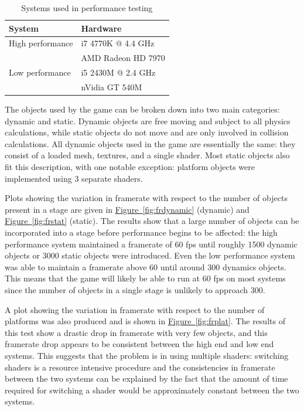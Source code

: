 \documentclass[12pt, titlepage]{article}
\begin{document}
\begin{table}[ht]
\caption{Systems used in performance testing} \label{tab:systems}
\begin{tabularx}{\textwidth}{p{5cm}X}
\toprule {\bf System} & {\bf Hardware}\\
\midrule
High performance & i7 4770K @ 4.4 GHz\\
& AMD Radeon HD 7970\\[10pt]
Low performance & i5 2430M @ 2.4 GHz\\
& nVidia GT 540M\\
\bottomrule
\end{tabularx}
\end{table}

The objects used by the game can be broken down into two main categories:  dynamic and static.  Dynamic objects are free moving and subject to all physics calculations, while static objects do not move and are only involved in collision calculations.  All dynamic objects used in the game are essentially the same: they consist of a loaded mesh, textures, and a single shader.  Most static objects also fit this description, with one notable exception:  platform objects were implemented using 3 separate shaders.

Plots showing the variation in framerate with respect to the number of objects present in a stage are given in \hyperref[fig:frdynamic]{Figure~\ref*{fig:frdynamic}} (dynamic) and \hyperref[fig:frstat]{Figure~\ref*{fig:frstat}} (static).  The results show that a large number of objects can be incorporated into a stage before performance begins to be affected:  the high performance system maintained a framerate of 60 fps until roughly 1500 dynamic objects or 3000 static objects were introduced.  Even the low performance system was able to maintain a framerate above 60 until around 300 dynamics objects.  This means that the game will likely be able to run at 60 fps on most systems since the number of objects in a single stage is unlikely to approach 300.  

A plot showing the variation in framerate with respect to the number of platforms was also produced and is shown in \hyperref[fig:frplat]{Figure~\ref*{fig:frplat}}.  The results of this test show a drastic drop in framerate with very few objects, and this framerate drop appears to be consistent between the high end and low end systems.  This suggests that the problem is in using multiple shaders:  switching shaders is a resource intensive procedure and the consistencies in framerate between the two systems can be explained by the fact that the amount of time required for switching a shader would be approximately constant between the two systems.
\end{document}
